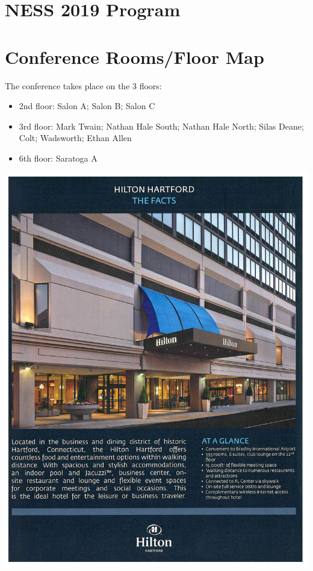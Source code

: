 \documentclass[10pt]{article}
\begin{document}





\section*{\centering NESS 2019 Program}
{\centering \small \tableofcontents}

\clearpage

\section*{Conference Rooms/Floor Map}

The conference takes place on the 3 floors:
\begin{itemize}
\item 2nd floor: Salon A; Salon B; Salon C
\item 3rd floor: Mark Twain; Nathan Hale South; Nathan Hale North;
  Silas Deane; Colt; Wadsworth; Ethan Allen
\item 6th floor: Saratoga A
\end{itemize}

\includegraphics[page=3, width=\textwidth, viewport=.23in 1.66in 8.1in 9.07in, clip=true]{hilton.pdf}
\end{document}
